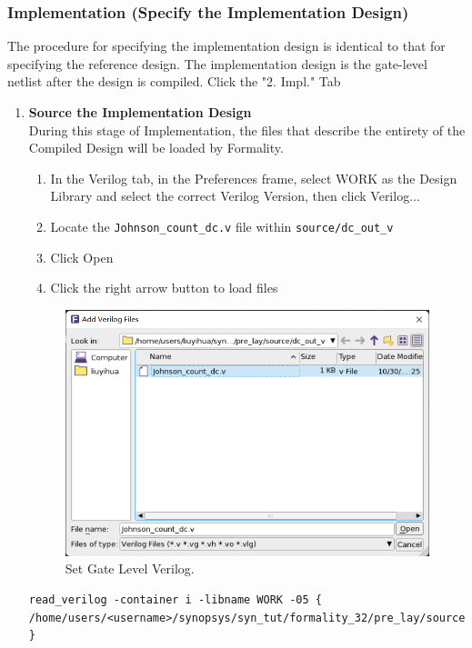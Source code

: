 \documentclass[a4paper,12pt,twoside]{article}
\begin{document}
\subsubsection{Implementation (Specify the Implementation Design)}
The procedure for specifying the implementation design is identical to that for specifying the reference design. The implementation design is the gate-level netlist after the design is compiled. Click the "2. Impl." Tab
\begin{enumerate}
    \item \textbf{Source the Implementation Design}\\
    During this stage of Implementation, the files that describe the entirety of the Compiled Design will be loaded by Formality.
    \begin{enumerate}
        \item In the Verilog tab, in the Preferences frame, select WORK as the Design Library and select the correct Verilog Version, then click Verilog...
        \item Locate the \texttt{Johnson\_count\_dc.v} file within \texttt{source/dc\_out\_v}
        \item Click Open
        \item Click the right arrow button to load files
    \end{enumerate}
    \begin{figure}[H]
        \centering
        \includegraphics[width=\textwidth]{images/45.png}
        \caption{Set Gate Level Verilog.}
    \end{figure}
    \begin{verbatim}
read_verilog -container i -libname WORK -05 { /home/users/<username>/synopsys/syn_tut/formality_32/pre_lay/source/dc_out_v/Johnson_count_dc.v } 

\end{verbatim}
\end{enumerate}
\end{document}
